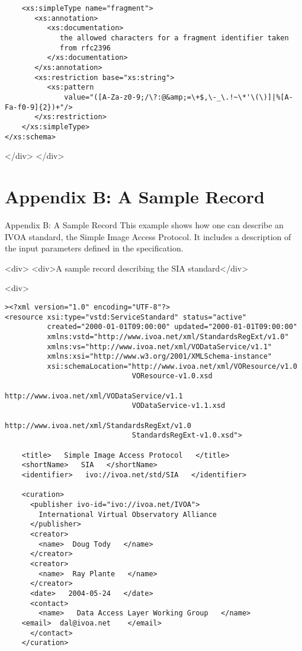 \documentclass[11pt,a4paper]{ivoa}
\begin{document}
{{\begin{verbatim}
    <xs:simpleType name="fragment">
       <xs:annotation>
          <xs:documentation>
             the allowed characters for a fragment identifier taken
             from rfc2396
          </xs:documentation>
       </xs:annotation>
       <xs:restriction base="xs:string">
          <xs:pattern
              value="([A-Za-z0-9;/\?:@&amp;=\+$,\-_\.!~\*'\(\)]|%[A-Fa-f0-9]{2})+"/>
       </xs:restriction>
    </xs:simpleType>
</xs:schema>
\end{verbatim}

</div>
</div>

\section{Appendix B: A Sample Record}

\label{}

Appendix B: A Sample Record
This example shows how one can describe an IVOA standard, the Simple
Image Access Protocol.  It includes a description of the input parameters
defined in the specification.  



<div>
<div>A
  sample record describing the SIA standard</div>

<div>
\begin{verbatim}><?xml version="1.0" encoding="UTF-8"?>
<resource xsi:type="vstd:ServiceStandard" status="active"
          created="2000-01-01T09:00:00" updated="2000-01-01T09:00:00"
          xmlns:vstd="http://www.ivoa.net/xml/StandardsRegExt/v1.0" 
          xmlns:vs="http://www.ivoa.net/xml/VODataService/v1.1" 
          xmlns:xsi="http://www.w3.org/2001/XMLSchema-instance"
          xsi:schemaLocation="http://www.ivoa.net/xml/VOResource/v1.0
                              VOResource-v1.0.xsd
                              http://www.ivoa.net/xml/VODataService/v1.1
                              VODataService-v1.1.xsd
                              http://www.ivoa.net/xml/StandardsRegExt/v1.0
                              StandardsRegExt-v1.0.xsd">

    <title>   Simple Image Access Protocol   </title>
    <shortName>   SIA   </shortName>
    <identifier>   ivo://ivoa.net/std/SIA   </identifier>

    <curation>
      <publisher ivo-id="ivo://ivoa.net/IVOA">
        International Virtual Observatory Alliance
      </publisher>
      <creator>
        <name>  Doug Tody   </name>
      </creator>
      <creator>
        <name>  Ray Plante   </name>
      </creator>
      <date>   2004-05-24   </date>
      <contact>
        <name>   Data Access Layer Working Group   </name>
	<email>  dal@ivoa.net    </email>
      </contact>
    </curation>


\end{verbatim}}}
\end{document}
